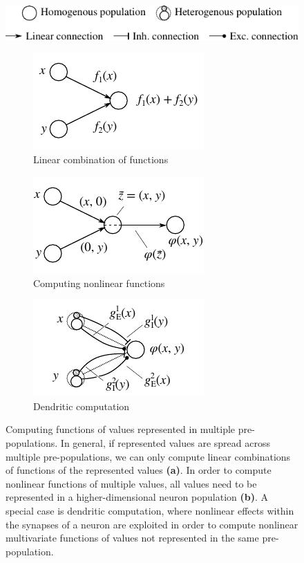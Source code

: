 \documentclass[10pt,letterpaper,oneside]{article}
\begin{document}
	\begin{figure}
		\centering%
		\includegraphics[scale=1.0]{media/network_legend_3.pdf}\\
		\begin{subfigure}{0.33\textwidth}%
			\includegraphics[scale=1.25]{media/network_a.pdf}%
			\caption{Linear combination of functions}
		\end{subfigure}%
		\begin{subfigure}{0.33\textwidth}%
			\includegraphics[scale=1.25]{media/network_c.pdf}%
			\caption{Computing nonlinear functions}
		\end{subfigure}%
		\begin{subfigure}{0.33\textwidth}%
			\includegraphics[scale=1.25]{media/network_d.pdf}%
			\caption{Dendritic computation}
		\end{subfigure}%
		\caption{Computing functions of values represented in multiple pre-populations. In general, if represented values are spread across multiple pre-populations, we can only compute linear combinations of functions of the represented values \textbf{(a)}. In order to compute nonlinear functions of multiple values, all values need to be represented in a higher-dimensional neuron population \textbf{(b)}. A special case is dendritic computation, where nonlinear effects within the synapses of a neuron are exploited in order to compute nonlinear multivariate functions of values not represented in the same pre-population.}
		\label{fig:network}
	\end{figure}
	
\end{document}

